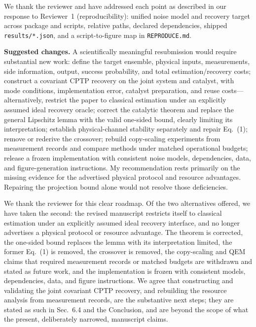 \documentclass[11pt,a4paper]{article}
\newcommand{\rev}[1]{{\color{black}#1}}
\newcommand{\resp}[1]{{\color{red}#1}}
\begin{document}
\resp{We thank the reviewer and have addressed each point as described in our response to Reviewer~1 (reproducibility): unified noise model and recovery target across package and scripts, relative paths, declared dependencies, shipped \texttt{results/*.json}, and a script-to-figure map in \texttt{REPRODUCE.md}.}

\rev{\textbf{Suggested changes.} A scientifically meaningful resubmission would require substantial new work: define the target ensemble, physical inputs, measurements, side information, output, success probability, and total estimation/recovery costs; construct a covariant CPTP recovery on the joint system and catalyst, with mode conditions, implementation error, catalyst preparation, and reuse costs---alternatively, restrict the paper to classical estimation under an explicitly assumed ideal recovery oracle; correct the catalytic theorem and replace the general Lipschitz lemma with the valid one-sided bound, clearly limiting its interpretation; establish physical-channel stability separately and repair Eq.~(1); remove or rederive the crossover; rebuild copy-scaling experiments from measurement records and compare methods under matched operational budgets; release a frozen implementation with consistent noise models, dependencies, data, and figure-generation instructions. My recommendation rests primarily on the missing evidence for the advertised physical protocol and resource advantages. Repairing the projection bound alone would not resolve those deficiencies.}

\resp{We thank the reviewer for this clear roadmap. Of the two alternatives offered, we have taken the second: the revised manuscript restricts itself to classical estimation under an explicitly assumed ideal recovery interface, and no longer advertises a physical protocol or resource advantage. The theorem is corrected, the one-sided bound replaces the lemma with its interpretation limited, the former Eq.~(1) is removed, the crossover is removed, the copy-scaling and QEM claims that required measurement records or matched budgets are withdrawn and stated as future work, and the implementation is frozen with consistent models, dependencies, data, and figure instructions. We agree that constructing and validating the joint covariant CPTP recovery, and rebuilding the resource analysis from measurement records, are the substantive next steps; they are stated as such in Sec.~6.4 and the Conclusion, and are beyond the scope of what the present, deliberately narrowed, manuscript claims.}
\end{document}
